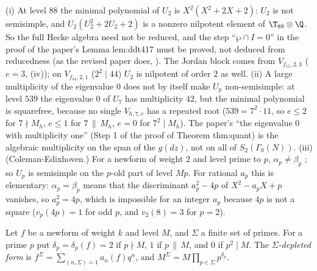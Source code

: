 \begin{remark}\label{rem:hecke:non-semisimple}
(i) At level $88$ the minimal polynomial of $U_2$ is $X^2(X^2+2X+2)$: $U_2$ is not semisimple, and $U_2(U_2^2+2U_2+2)$ is a nonzero nilpotent element of $\T_{88}\otimes\Q$. So the full Hecke
algebra need not be reduced, and the step ``$\wp\cap I=0$'' in the proof of the paper's Lemma lem:ddt417 must be proved, not deduced from reducedness (as the revised paper does,
). The Jordan block comes from $V_{f_{11},2,3}$ ($e=3$, (iv)); on $V_{f_{44},2,1}$ ($2^2\mid44$) $U_2$ is nilpotent of order $2$ as well. (ii) A
large multiplicity of the eigenvalue $0$ does not by itself make $U_p$ non-semisimple: at level $539$ the eigenvalue $0$ of $U_7$ has multiplicity $42$, but the minimal polynomial
is squarefree, because no single $V_{h,7,e}$ has a repeated root ($539=7^2\cdot11$, so $e\le2$ for $7\nmid M_h$, $e\le1$ for $7\,\|\,M_h$, $e=0$ for $7^2\mid M_h$). The paper's ``the eigenvalue $0$ with
multiplicity one'' (Step 1 of the proof of Theorem thm:quant) is the algebraic multiplicity on the span of the $g(dz)$, not on all of $S_2(\Gamma_0(N))$. (iii) (Coleman-Edixhoven.) For a
newform of weight $2$ and level prime to $p$, $\alpha_p\ne\beta_p$ \cite{ColemanEdixhoven}; so $U_p$ is semisimple on the $p$-old part of level $Mp$. For rational $a_p$ this is
elementary: $\alpha_p=\beta_p$ means that the discriminant $a_p^2-4p$ of $X^2-a_pX+p$ vanishes, so $a_p^2=4p$, which is impossible for an integer $a_p$ because $4p$ is not a
square ($v_p(4p)=1$ for odd $p$, and $v_2(8)=3$ for $p=2$).
\end{remark}

\begin{definition}\label{def:hecke:depletion}
Let $f$ be a newform of weight $k$ and level $M$, and $\Sigma$ a finite set of primes. For a prime $p$ put $\delta_p=\delta_p(f)=2$ if $p\nmid M$, $1$ if $p\,\|\,M$, and $0$ if $p^2\mid M$. The
\emph{$\Sigma$-depleted form} is $f^\Sigma=\sum_{(n,\Sigma)=1}a_n(f)q^n$, and $M^\Sigma=M\prod_{p\in\Sigma}p^{\delta_p}$.
\end{definition}


